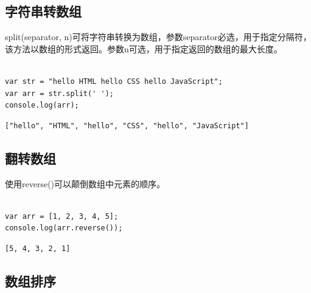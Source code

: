 \vspace{0.5cm}

\subsection{字符串转数组}

split(separator, n)可将字符串转换为数组，参数separator必选，用于指定分隔符，该方法以数组的形式返回。参数n可选，用于指定返回的数组的最大长度。\\

\\

\begin{lstlisting}[style=htmlcssjs]
var str = "hello HTML hello CSS hello JavaScript";
var arr = str.split(' ');
console.log(arr);
\end{lstlisting}

\begin{tcolorbox}
	\begin{verbatim}
["hello", "HTML", "hello", "CSS", "hello", "JavaScript"]
	\end{verbatim}
\end{tcolorbox}

\vspace{0.5cm}

\subsection{翻转数组}

使用reverse()可以颠倒数组中元素的顺序。\\

\\

\begin{lstlisting}[style=htmlcssjs]
var arr = [1, 2, 3, 4, 5];
console.log(arr.reverse());
\end{lstlisting}

\begin{tcolorbox}
	\begin{verbatim}
[5, 4, 3, 2, 1]
	\end{verbatim}
\end{tcolorbox}

\vspace{0.5cm}

\subsection{数组排序}

